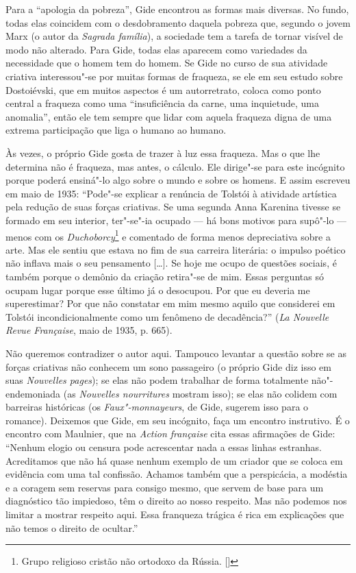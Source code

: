 Para a ``apologia da pobreza'', Gide encontrou as formas mais diversas.
No fundo, todas elas coincidem com o desdobramento daquela pobreza que,
segundo o jovem Marx (o autor da \emph{Sagrada família}), a sociedade
tem a tarefa de tornar visível de modo não alterado. Para Gide, todas elas
aparecem como variedades da necessidade que o homem tem do homem. Se
Gide no curso de sua atividade criativa interessou"-se por muitas formas
de fraqueza, se ele em seu estudo sobre Dostoiévski, que em muitos
aspectos é um autorretrato, coloca como ponto central a fraqueza como
uma ``insuficiência da carne, uma inquietude, uma anomalia'', então ele
tem sempre que lidar com aquela fraqueza digna de uma extrema
participação que liga o humano ao humano.

Às vezes, o próprio Gide gosta de trazer à luz essa fraqueza. Mas o que
lhe determina não é fraqueza, mas antes, o cálculo. Ele dirige"-se para
este incógnito porque poderá ensiná"-lo algo sobre o mundo e sobre os
homens. E assim escreveu em maio de 1935: ``Pode"-se explicar a renúncia
de Tolstói à atividade artística pela redução de suas forças criativas.
Se uma segunda Anna Karenina tivesse se formado em seu interior,
ter"-se"-ia ocupado --- há bons motivos para supô"-lo --- menos com os
\emph{Duchoborcy}\footnote{Grupo religioso cristão não ortodoxo da Rússia. []} e comentado de forma menos depreciativa sobre a arte.
Mas ele sentiu que estava no fim de sua carreira literária: o impulso
poético não inflava mais o seu pensamento [\ldots{}]. Se hoje me ocupo de
questões sociais, é também porque o demônio da criação retira"-se de mim.
Essas perguntas só ocupam lugar porque esse último já o desocupou. Por
que eu deveria me superestimar? Por que não constatar em mim mesmo
aquilo que considerei em Tolstói incondicionalmente como um fenômeno de
decadência?'' (\emph{La Nouvelle Revue Française}, maio de 1935, p.
665).

Não queremos contradizer o autor aqui. Tampouco levantar a questão sobre
se as forças criativas não conhecem um sono passageiro (o próprio Gide
diz isso em suas \emph{Nouvelles pages}); se elas não podem trabalhar de
forma totalmente não"-endemoniada (as \emph{Nouvelles nourritures}
mostram isso); se elas não colidem com barreiras históricas (os
\emph{Faux"-monnayeurs}, de Gide, sugerem isso para o romance). Deixemos
que Gide, em seu incógnito, faça um encontro instrutivo. É o encontro
com Maulnier, que na \emph{Action française} cita essas afirmações de
Gide: ``Nenhum elogio ou censura pode acrescentar nada a essas linhas
estranhas. Acreditamos que não há quase nenhum exemplo de um criador
que se coloca em evidência com uma tal confissão. Achamos também que a
perspicácia, a modéstia e a coragem sem reservas para consigo mesmo, que
servem de base para um diagnóstico tão impiedoso, têm o direito ao nosso
respeito. Mas não podemos nos limitar a mostrar respeito aqui. Essa
franqueza trágica é rica em explicações que não temos o direito de
ocultar.''


